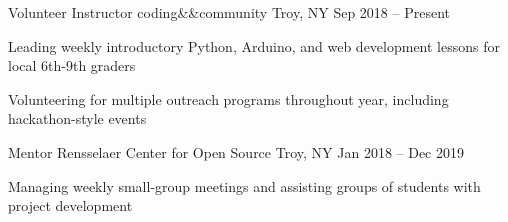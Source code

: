 


\begin{cventries}

  \cventry
  {Volunteer Instructor}
  {coding\&\&community}
  {Troy, NY}
  {Sep 2018 -- Present}
  {
    \begin{cvitems}
      \item {Leading weekly introductory Python, Arduino, and web development lessons for local 6th-9th graders}
      \item {Volunteering for multiple outreach programs throughout year, including hackathon-style events}
    \end{cvitems}
  }


  \cventry
  {Mentor}
  {Rensselaer Center for Open Source}
  {Troy, NY}
  {Jan 2018 -- Dec 2019}
  {
    \begin{cvitems}
      \item {Managing weekly small-group meetings and assisting groups of students with project development}
    \end{cvitems}
  }



\end{cventries}
